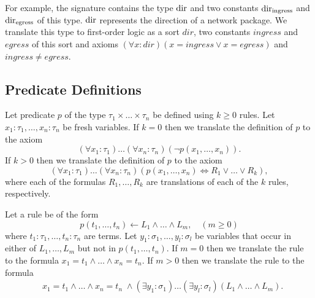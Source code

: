 For example, the signature contains the type $\mathrm{dir}$ and two constants $\mathrm{dir}_\text{ingress}$ and $\mathrm{dir}_\text{egress}$ of this type. $\mathrm{dir}$ represents the direction of a network package. We translate this type to first-order logic as a sort $\mathit{dir}$, two constants $\mathit{ingress}$ and $\mathit{egress}$ of this sort and axioms $(\forall x:\mathit{dir})(x=\mathit{ingress}\vee x=\mathit{egress})$ and $\mathit{ingress}\neq\mathit{egress}$.


\subsection{Predicate Definitions}\label{sect:aws/fol/predicates}

Let predicate $p$ of the type $\tau_1\times\ldots\times\tau_n$ be defined using $k\ge0$ rules. Let $x_1:\tau_1,\ldots,x_n:\tau_n$ be fresh variables. If $k=0$ then we translate the definition of $p$ to the axiom $$(\forall x_1:\tau_1)\ldots(\forall x_n:\tau_n)(\neg p(x_1,\ldots,x_n)).$$ If $k>0$ then we translate the definition of $p$ to the axiom $$(\forall x_1:\tau_1)\ldots(\forall x_n:\tau_n)(p(x_1,\ldots,x_n)\Leftrightarrow R_1\vee\ldots\vee R_k),$$ where each of the formulas $R_1,\ldots,R_k$ are translations of each of the $k$ rules, respectively.

Let a rule be of the form $$p(t_1,\ldots,t_n)\leftarrow L_1\wedge\ldots\wedge L_m,\quad(m\ge0)$$ where $t_1:\tau_1,\ldots,t_n:\tau_n$ are terms. Let $y_1:\sigma_1,\ldots,y_l:\sigma_l$ be variables that occur in either of $L_1,\ldots,L_m$ but not in $p(t_1,\ldots,t_n)$. If $m=0$ then we translate the rule to the formula $x_1=t_1\wedge\ldots\wedge x_n=t_n.$ If $m>0$ then we translate the rule to the formula
\begin{equation*}
\begin{aligned}
&x_1=t_1\wedge\ldots\wedge x_n=t_n\;\wedge(\exists y_1:\sigma_1)\ldots(\exists y_l:\sigma_l)(L_1\wedge\ldots\wedge L_m).
\end{aligned}
\end{equation*}


